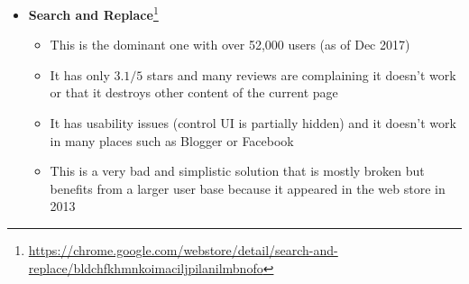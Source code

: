 \documentclass[bsc,frontabs,twoside,singlespacing,parskip,deptreport]{infthesis}
\providecommand{\tightlist}{%
  \setlength{\itemsep}{0pt}\setlength{\parskip}{0pt}}
\begin{document}
\begin{itemize}
\item
  {\bf Search and Replace}\footnote{\href{https://chrome.google.com/webstore/detail/search-and-replace/bldchfkhmnkoimaciljpilanilmbnofo}{https://chrome.google.com/webstore/detail/search-and-replace/bldchfkhmnkoimaciljpilanilmbnofo}}
  
  \begin{itemize}
  \tightlist
\item
  This is the dominant one with over 52,000 users (as of Dec 2017)
\item
  It has only $3.1/5$ stars and many reviews are complaining it doesn't work or that it destroys other content of the current page
\item
  It has usability issues (control UI is partially hidden) and it doesn't work in many places such as Blogger or Facebook
\item
  This is a very bad and simplistic solution that is mostly broken but benefits from a larger user base because it appeared in the web store in 2013
  \end{itemize}
  

\end{itemize}
\end{document}
